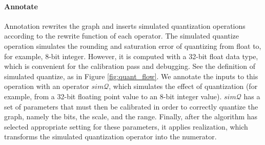 \paragraph{Annotate}
Annotation rewrites the graph and inserts simulated quantization operations according to the
rewrite function of  each  operator. The simulated quantize operation simulates the rounding
and saturation error of quantizing from float to, for example, 8-bit integer.
However, it is computed with a 32-bit float data type, which is convenient for the
calibration pass and debugging.
See the definition of simulated quantize, as in Figure \ref{fig:quant_flow}.
We annotate the inputs to this operation with an operator $sim\mathcal{Q}$,
  which simulates the effect of quantization (for example, from a 32-bit
  floating point value to an 8-bit integer value).
$sim\mathcal{Q}$ has a set of parameters that must then be calibrated in order to
correctly quantize the graph, namely the bits, the scale, and the range.
Finally, after the algorithm has selected
appropriate setting for these parameters, it applies realization,
which transforms the simulated quantization operator into the numerator.


